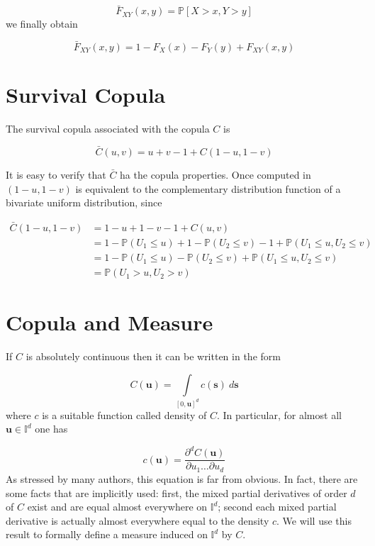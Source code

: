 \documentclass{article}
\begin{document}
\begin{equation}
\bar F_{XY}(x, y ) = \mathbb{P}[X > x, Y > y]
\end{equation}
we finally obtain

\begin{equation}
\bar F_{XY}(x, y ) = 1 - F_X(x) - F_Y(y) + F_{XY}(x, y)
\end{equation}
%
%
\section{Survival Copula}
The survival copula associated with the copula $C$ is

\begin{equation}
\bar C (u, v) = u + v - 1 + C(1-u, 1-v)
\end{equation}

It is easy to verify that $\bar C$ ha the copula properties. Once computed in $(1-u , 1-v)$ is equivalent to the complementary distribution function of a bivariate uniform distribution, since

\begin{align}
\bar C (1-u, 1- v) & = 1 - u + 1 - v - 1 + C(u, v) \\
& = 1 - \mathbb{P} (U_1 \le u) + 1 - \mathbb{P} (U_2 \le v) - 1 + \mathbb{P} (U_1 \le u, U_2 \le v) \\
& = 1 - \mathbb{P} (U_1 \le u) - \mathbb{P} (U_2 \le v) + \mathbb{P} (U_1 \le u, U_2 \le v) \\
& = \mathbb{P} (U_1 > u, U_2 > v)
\end{align}
%
%
\section{Copula and Measure}

If $C$ is absolutely continuous then it can be written in the form 

\begin{equation}
C(\mathbf{u}) = \int\limits_{[0, \mathbf{u}]^d} c(\mathbf{s}) \> d \mathbf{s}
\end{equation}
where $c$ is a suitable function called density of $C$. In particular, for almost all $\mathbf{u} \in \mathbb{I}^d$ one has

\begin{equation}
c(\mathbf{u}) = \frac{\partial^d C(\mathbf{u})}{\partial u_1 \dots \partial u_d}
\end{equation}
As stressed by many authors, this equation is far from obvious. In fact, there are some facts that are implicitly used: first, the mixed partial derivatives of order $d$ of $C$ exist and are equal almost everywhere on $\mathbb{I}^d$; second each mixed partial derivative is actually almost everywhere equal to the density $c$. We will use this result to formally define a measure induced on $\mathbb{I}^d$ by $C$. 
\end{document}
